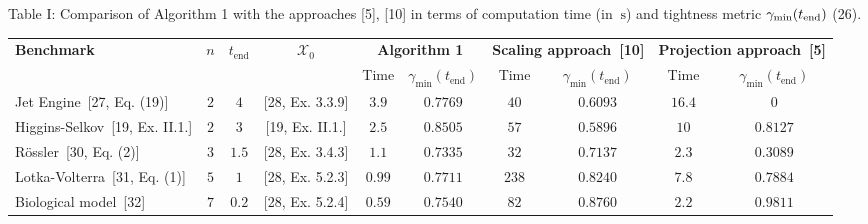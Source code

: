 \begin{small}
Table I: Comparison of Algorithm 1 with the approaches [5], [10] in terms of computation time (in $\SI{}{\second}$) and tightness metric $\gamma_{\min}(t_{\normalfont\text{end}})$ (26).
\end{small}

\smallskip

\begin{footnotesize}
\begin{tabular}{l c c c c c c c c c}
    \toprule
    \multirow{2}{*}{\textbf{Benchmark}} & \multirow{2}{*}{$n$} & \multirow{2}{*}{$t_{\text{end}}$} & \multirow{2}{*}{$\mathcal{X}_0$} & \multicolumn{2}{c}{\textbf{Algorithm 1}} & \multicolumn{2}{c}{\textbf{Scaling approach~[10]}} & \multicolumn{2}{c}{\textbf{Projection approach~[5]}} \\
    & & & & Time & $\gamma_{\min}(t_{\text{end}})$ & Time & $\gamma_{\min}(t_{\text{end}})$ & Time & $\gamma_{\min}(t_{\text{end}})$ \\ \midrule
    Jet Engine~[27, Eq. (19)] & $2$ & $4$ & [28, Ex. 3.3.9]
    & $\mathbf{3.9}$ & $\mathbf{0.7769}$ & $40$ & $0.6093$ & $16.4$ & $0$ \\
    Higgins-Selkov~[19, Ex. II.1.] & $2$ & $3$ & [19, Ex. II.1.]
    & $\mathbf{2.5}$ & $\mathbf{0.8505}$ & $57$ & $0.5896$ & $10$ & $0.8127$ \\
    Rössler~[30, Eq. (2)] & $3$ & $1.5$ & [28, Ex. 3.4.3]
    & $\mathbf{1.1}$ & $\mathbf{0.7335}$ & $32$ & $0.7137$ & $2.3$ & $0.3089$ \\
    Lotka-Volterra~[31, Eq. (1)] & $5$ & $1$ & [28, Ex. 5.2.3]
    & $\mathbf{0.99}$ & $0.7711$ & $238$ & $\mathbf{0.8240}$ & $7.8$ & $0.7884$ \\
    Biological model~[32] & $7$ & $0.2$ & [28, Ex. 5.2.4]
    & $\mathbf{0.59}$ & $0.7540$ & $82$ & $0.8760$ & $2.2$ & $\mathbf{0.9811}$ \\
    \bottomrule
\end{tabular}
\end{footnotesize}
